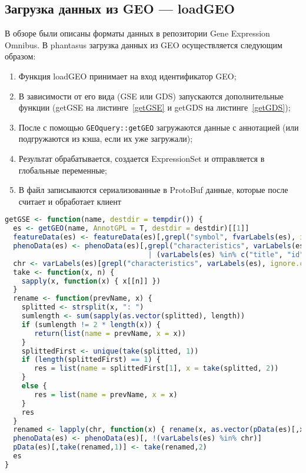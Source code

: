 \documentclass[specification,annotation]{itmo-student-thesis}
\begin{document}
\subsection{Загрузка данных из GEO --- loadGEO}
В обзоре были описаны форматы данных в репозитории Gene Expression Omnibus.
В phantasus загрузка данных из GEO осуществляется следующим образом:
\begin{enumerate}
\item Функция loadGEO принимает на вход идентификатор GEO;
\item В зависимости от его вида (GSE или GDS) запускаются дополнительные функции (getGSE на листинге~\ref{getGSE} и getGDS на листинге~\ref{getGDS});
\item После с помощью \texttt{GEOquery::getGEO} загружаются данные с аннотацией (или подгружаются из кэша, если их уже загружали);
\item Результат обрабатывается, создается ExpressionSet и отправляется в глобальные переменные;
\item В файл записываются сериализованные в ProtoBuf данные, которые после считает и обработает клиент
\end{enumerate}
\begin{lstlisting}[float=!h,caption={Загрузка данных типа GSE из Gene Expression Omnibus},label={getGSE},language=R]
getGSE <- function(name, destdir = tempdir()) {
  es <- getGEO(name, AnnotGPL = T, destdir = destdir)[[1]]
  featureData(es) <- featureData(es)[,grepl("symbol", fvarLabels(es), ignore.case = T)]
  phenoData(es) <- phenoData(es)[,grepl("characteristics", varLabels(es), ignore.case = T)
                                  | (varLabels(es) %in% c("title", "id", "geo_accession"))]
  chr <- varLabels(es)[grepl("characteristics", varLabels(es), ignore.case = T)]
  take <- function(x, n) {
    sapply(x, function(x) { x[[n]] })
  }
  rename <- function(prevName, x) {
    splitted <- strsplit(x, ": ")
    sumlength <- sum(sapply(as.vector(splitted), length))
    if (sumlength != 2 * length(x)) {
       return(list(name = prevName, x = x))
    }
    splittedFirst <- unique(take(splitted, 1))
    if (length(splittedFirst) == 1) {
       res = list(name = splittedFirst[1], x = take(splitted, 2))
    }
    else {
       res = list(name = prevName, x = x)
    }
    res
  }
  renamed <- lapply(chr, function(x) { rename(x, as.vector(pData(es)[,x])) })
  phenoData(es) <- phenoData(es)[, !(varLabels(es) %in% chr)]
  pData(es)[,take(renamed,1)] <- take(renamed,2)
  es
}
\end{lstlisting}
\end{document}
